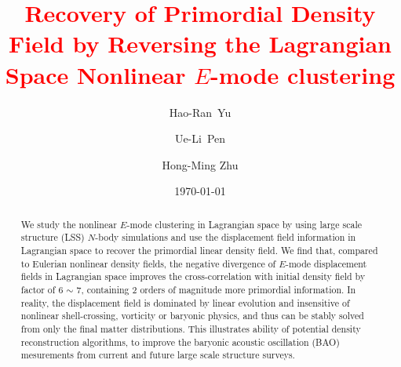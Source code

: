 \documentclass[aps,prd,twocolumn,superscriptaddress,amsfont,amssymb,amsmath,nofootinbib,showpacs,balancelastpage]{revtex4-1}
\newcommand{\tcr}{\textcolor{red}}
\begin{document}
\addtolength{\hoffset}{-0.525cm}
\addtolength{\textwidth}{1.05cm}
\title{\tcr{Recovery of Primordial Density Field by Reversing the Lagrangian Space Nonlinear $E$-mode clustering}}

\author{Hao-Ran~Yu}%

\author{Ue-Li~Pen}%

\author{Hong-Ming Zhu}%

\date{\today}

\begin{abstract}
We study the nonlinear $E$-mode clustering in Lagrangian space
by using large scale structure (LSS) $N$-body simulations
and use the displacement field information in Lagrangian space
to recover the primordial linear density field.
We find that, compared to Eulerian nonlinear density fields,
the negative divergence of $E$-mode displacement fields
in Lagrangian space improves the cross-correlation with
initial density field by factor of 6 $\sim$ 7,
containing 2 orders of magnitude more primordial information. 
In reality, the displacement field is dominated by linear evolution
and insensitive of nonlinear shell-crossing, vorticity or
baryonic physics, and thus can be stably solved from only
the final matter distributions.
This illustrates ability of potential density reconstruction algorithms,
to improve the baryonic acoustic oscillation (BAO) mesurements
from current and future large scale structure surveys.


\end{abstract}
\end{document}
